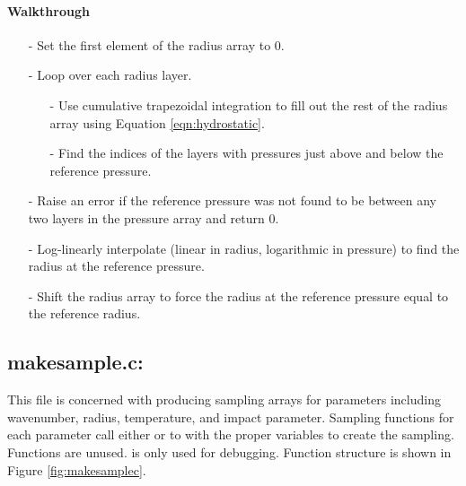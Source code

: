\documentclass[letterpaper,12pt]{article}
\begin{document}
\paragraph{Walkthrough}
\begin{enumerate}[leftmargin=10pt, noitemsep, parsep=0pt, topsep=0ex]
\item[-] Set the first element of the radius array to 0.
\item[-] Loop over each radius layer.
\begin{enumerate}[leftmargin=10pt, noitemsep, parsep=0pt, topsep=0ex]
\item[-] Use cumulative trapezoidal integration to fill out the rest of the radius array using Equation \ref{eqn:hydrostatic}.
\item[-] Find the indices of the layers with pressures just above and below the reference pressure.
\end{enumerate}
\item[-] Raise an error if the reference pressure was not found to be between any two layers in the pressure array and return 0.
\item[-] Log-linearly interpolate (linear in radius, logarithmic in pressure) to find the radius at the reference pressure.
\item[-] Shift the radius array to force the radius at the reference pressure equal to the reference radius.
\end{enumerate}


\newpage
\subsection{makesample.c:}
This file is concerned with producing sampling arrays for parameters including wavenumber, radius, temperature, and impact parameter. Sampling functions for each parameter call either  or  to with the proper variables to create the sampling. Functions  are unused.  is only used for debugging. Function structure is shown in Figure \ref{fig:makesamplec}.
\end{document}
